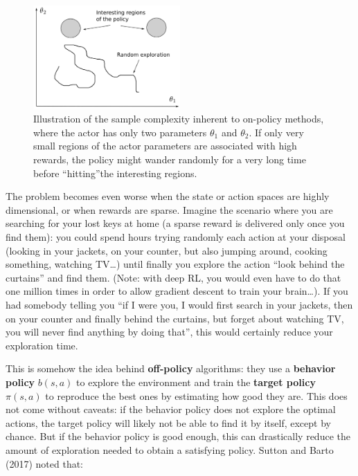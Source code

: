 \documentclass[
  letterpaper,
  DIV=11,
  numbers=noendperiod]{scrreprt}
\begin{document}
\begin{figure}

{\centering \includegraphics[width=0.5\textwidth,height=\textheight]{./img/onpolicyexploration.png}

}

\caption{\label{fig-onlinepolicyexploration}Illustration of the sample
complexity inherent to on-policy methods, where the actor has only two
parameters \(\theta_1\) and \(\theta_2\). If only very small regions of
the actor parameters are associated with high rewards, the policy might
wander randomly for a very long time before ``hitting''the interesting
regions.}

\end{figure}

The problem becomes even worse when the state or action spaces are
highly dimensional, or when rewards are sparse. Imagine the scenario
where you are searching for your lost keys at home (a sparse reward is
delivered only once you find them): you could spend hours trying
randomly each action at your disposal (looking in your jackets, on your
counter, but also jumping around, cooking something, watching TV\ldots)
until finally you explore the action ``look behind the curtains'' and
find them. (Note: with deep RL, you would even have to do that one
million times in order to allow gradient descent to train your
brain\ldots). If you had somebody telling you ``if I were you, I would
first search in your jackets, then on your counter and finally behind
the curtains, but forget about watching TV, you will never find anything
by doing that'', this would certainly reduce your exploration time.

This is somehow the idea behind \textbf{off-policy} algorithms: they use
a \textbf{behavior policy} \(b(s, a)\) to explore the environment and
train the \textbf{target policy} \(\pi(s, a)\) to reproduce the best
ones by estimating how good they are. This does not come without
caveats: if the behavior policy does not explore the optimal actions,
the target policy will likely not be able to find it by itself, except
by chance. But if the behavior policy is good enough, this can
drastically reduce the amount of exploration needed to obtain a
satisfying policy. Sutton and Barto (2017) noted that:
\end{document}
